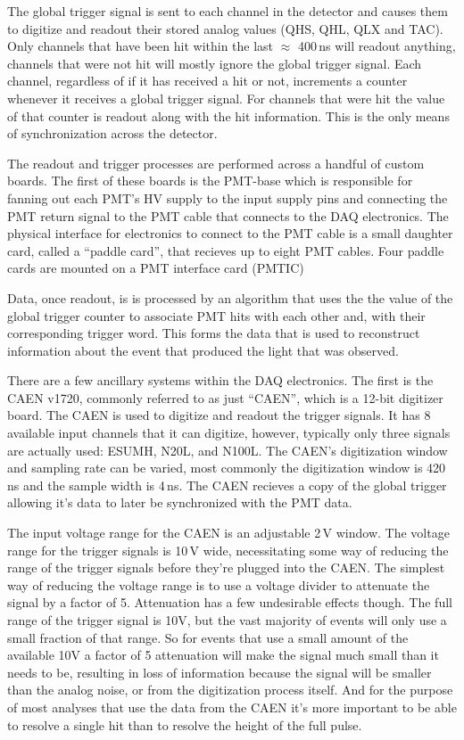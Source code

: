 The global trigger signal is sent to each channel in the detector and
causes them to digitize and readout their stored analog values (QHS, QHL, QLX and TAC).
Only channels that have been hit within the last $\approx$ 400\,ns will readout
anything, channels that were not hit will mostly ignore the global trigger signal.
Each channel, regardless of if it has received a hit or not, increments
a counter whenever it receives a global trigger signal.
For channels that were hit the value of that counter is readout
along with the hit information.
This is the only means of synchronization across the detector.

The readout and trigger processes are performed across
a handful of custom boards. The first of these boards is the PMT-base which
is responsible for fanning out each PMT's HV supply to the input supply
pins and connecting the PMT return signal to the PMT cable that connects to
the DAQ electronics.
The physical interface for electronics to connect to the PMT cable is a
small daughter card, called a ``paddle card'', that recieves up to eight PMT cables.
Four paddle cards are mounted on a PMT interface card (PMTIC) 

Data, once readout, is is processed by an algorithm that uses the
the value of the global trigger counter to associate PMT hits with
each other and, with their corresponding trigger word.
This forms the data that is used to reconstruct information
about the event that produced the light that was observed.

There are a few ancillary systems within the DAQ electronics.
The first is the CAEN v1720, commonly
referred to as just ``CAEN'', which is a 12-bit digitizer board.
The CAEN is used to digitize and readout the trigger signals.
It has 8 available input channels that it can digitize, however,
typically only three signals are actually used: ESUMH, N20L, and
N100L. The CAEN's digitization window and sampling rate can be varied,
most commonly the digitization window is 420\,ns and the sample width
is 4\,ns. The CAEN recieves a copy of the global trigger allowing it's
data to later be synchronized with the PMT data.

The input voltage range for the CAEN is an adjustable 2\,V window.
The voltage range for the trigger signals is 10\,V wide,
necessitating some way of reducing the range of the trigger signals
before they're plugged into the CAEN.
The simplest way of reducing the voltage range is to use a voltage
divider to attenuate the signal by a factor of 5.
Attenuation has a few undesirable effects though.
The full range of the trigger signal is 10V, but the vast
majority of events will only use a small fraction of that range.
So for events that use a small amount of the available 10V a factor
of 5 attenuation will make the signal much small than it needs to be,
resulting in loss of information because the signal will be smaller than
the analog noise, or from the digitization process itself.
And for the purpose of most analyses that use the data from the CAEN
it's more important to be able to resolve a single hit than to resolve
the height of the full pulse.


